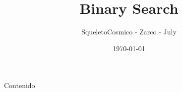 \documentclass[aspectratio=169]{beamer} %
\title{Binary Search}
\author{SqueletoCosmico - Zarco - July}
\date{\today}
\begin{document}
\portadapumasmas
\usebackgroundtemplate{}

\begin{frame}{Contenido}
	\tableofcontents
\end{frame}


%






\end{document}
